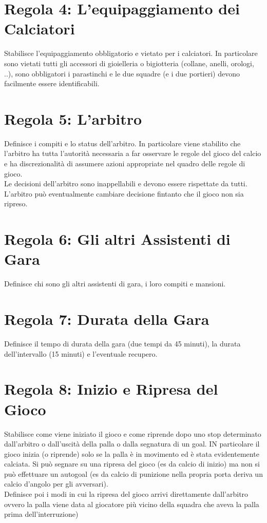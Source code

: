 \documentclass[../uefaC.tex]{subfiles}
\begin{document}
\section{Regola 4: L'equipaggiamento dei Calciatori}
Stabilisce l'equipaggiamento obbligatorio e vietato per i calciatori. In particolare sono vietati tutti gli accessori di gioielleria o bigiotteria (collane, anelli, orologi, ..), sono obbligatori i parastinchi e le due squadre (e i due portieri) devono facilmente essere identificabili.

\section{Regola 5: L'arbitro}
Definisce i compiti e lo status dell'arbitro. In particolare viene stabilito che l'arbitro ha tutta l'autorità necessaria a far osservare le regole del gioco del calcio e ha discrezionalità di assumere azioni appropriate nel quadro delle regole di gioco. \hfill \\
Le decisioni dell'arbitro sono inappellabili e devono essere rispettate da tutti. L'arbitro può eventualmente cambiare decisione fintanto che il gioco non sia ripreso.

\section{Regola 6: Gli altri Assistenti di Gara}
Definisce chi sono gli altri assistenti di gara, i loro compiti e mansioni.

\section{Regola 7: Durata della Gara}
Definisce il tempo di durata della gara (due tempi da 45 minuti), la durata dell'intervallo (15 minuti) e l'eventuale recupero.

\section{Regola 8: Inizio e Ripresa del Gioco}
Stabilisce come viene iniziato il gioco e come riprende dopo uno stop determinato dall'arbitro o dall'uscità della palla o dalla segnatura di un goal. IN particolare il gioco inizia (o riprende) solo se la palla è in movimento ed è stata evidentemente calciata. Si può segnare su una ripresa del gioco (es da calcio di inizio) ma non si può effettuare un autogoal (es da calcio di punizione nella propria porta deriva un calcio d'angolo per gli avversari). \hfill \\
Definisce poi i modi in cui la ripresa del gioco arrivi direttamente dall'arbitro ovvero la palla viene data al giocatore più vicino della squadra che aveva la palla prima dell'interruzione)
\end{document}
